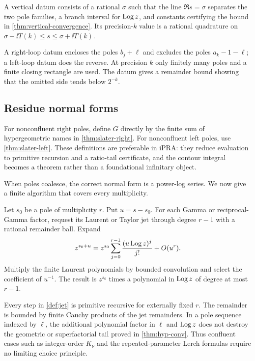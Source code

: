 \begin{definition}
A vertical datum consists of a rational $\sigma$ such that the line
$\Re s=\sigma$ separates the two pole families, a branch interval for
$\operatorname{Log} z$, and constants certifying the bound in
\cref{thm:vertical-convergence}.  Its precision-$k$ value is a rational
quadrature on $\sigma-\ii T(k)\le s\le\sigma+\ii T(k)$.
\end{definition}

\begin{definition}
A right-loop datum encloses the poles $b_j+\ell$ and excludes the poles
$a_k-1-\ell$; a left-loop datum does the reverse.  At precision $k$ only
finitely many poles and a finite closing rectangle are used.  The datum gives
a remainder bound showing that the omitted side tends below $2^{-k}$.
\end{definition}

\subsection{Residue normal forms}

For nonconfluent right poles, define $G$ directly by the finite sum of
hypergeometric names in \cref{thm:slater-right}.  For nonconfluent left poles,
use \cref{thm:slater-left}.  These definitions are preferable in iPRA: they
reduce evaluation to primitive recursion and a ratio-tail certificate, and the
contour integral becomes a theorem rather than a foundational infinitary
object.

When poles coalesce, the correct normal form is a power-log series.  We now give
a finite algorithm that covers every multiplicity.

\begin{definition}\label{def:jet}
Let $s_0$ be a pole of multiplicity $r$.  Put $u=s-s_0$.  For each Gamma or
reciprocal-Gamma factor, request its Laurent or Taylor jet through degree
$r-1$ with a rational remainder ball.  Expand
\[
 z^{s_0+u}=z^{s_0}\sum_{j=0}^{r-1}\frac{(u\operatorname{Log} z)^j}{j!}+O(u^r).
\]
Multiply the finite Laurent polynomials by bounded convolution and select the
coefficient of $u^{-1}$.  The result is
$z^{s_0}$ times a polynomial in $\operatorname{Log} z$ of degree at most $r-1$.
\end{definition}
Every step in \cref{def:jet} is primitive recursive for externally fixed $r$.
The remainder is bounded by finite Cauchy products of the jet remainders.  In a
pole sequence indexed by $\ell$, the additional polynomial factor in $\ell$
and $\operatorname{Log} z$ does not destroy the geometric or superfactorial tail proved in
\cref{thm:hyp-conv}.  Thus confluent cases such as integer-order $K_\nu$ and the
repeated-parameter Lerch formulas require no limiting choice principle.

